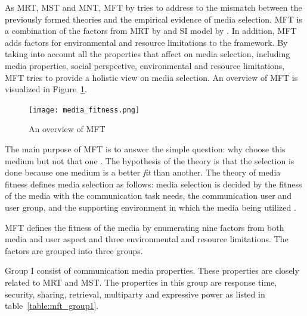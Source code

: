 \documentclass[english,12pt,a4paper,pdftex]{article}
\begin{document}
As \ac{MRT}, \ac{MST} and \ac{MNT}, \ac{MFT} by \citep{higa2007} tries to address to the mismatch between the previously formed theories and the empirical evidence of media selection. \ac{MFT} is a combination of the factors from \ac{MRT} by \citet{daft1986} and \ac{SI} model by \citet{fulk1987}. In addition, \ac{MFT} adds factors for environmental and resource limitations to the framework. By taking into account all the properties that affect on media selection, including media properties, social perspective, environmental and resource limitations, \ac{MFT} tries to provide a holistic view on media selection. An overview of \ac{MFT} is visualized in Figure~\ref{fig:media_fitness}.

\begin{figure}[htb]
\begin{center}
\texttt{[image: media\_fitness.png]}
\end{center}
\caption{An overview of \ac{MFT} \citep{higa2007}}
\label{fig:media_fitness}
\end{figure}

The main purpose of \ac{MFT} is to answer the simple question: why choose this medium but not that one \citep{higa2007}. The hypothesis of the theory is that the selection is done because one medium is a better \emph{fit} than another. The theory of media fitness defines media selection as follows: media selection is decided by the fitness of the media with the communication task needs, the communication user and user group, and the supporting environment in which the media being utilized \citep{higa2007}.

\ac{MFT} defines the fitness of the media by enumerating nine factors from both media and user aspect and three environmental and resource limitations. The factors are grouped into three groups. 

Group I consist of communication media properties. These properties are closely related to \ac{MRT} and \ac{MST}. The properties in this group are response time, security, sharing, retrieval, multiparty and expressive power as listed in table~\ref{table:mft_group1}.
\end{document}
